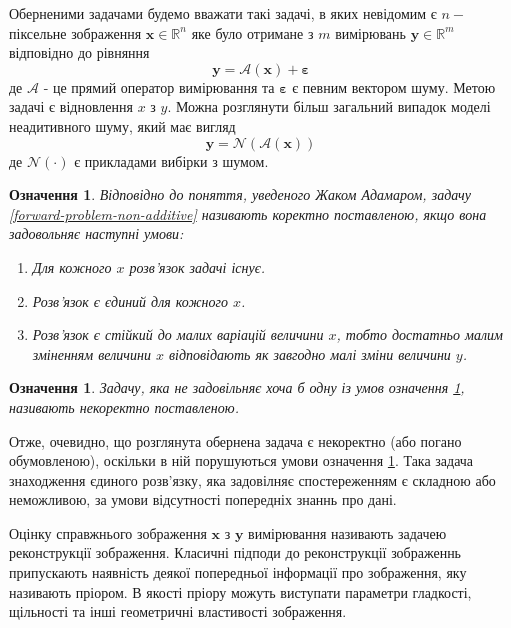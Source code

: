 \documentclass[14pt,a4paper]{extarticle}
\newcounter{e}
\newtheorem{defn}[theorem]{Означення}
\numberwithin{equation}{section}
\numberwithin{figure}{section}
\begin{document}
	
	
	
	Оберненими задачами будемо вважати такі задачі, в яких невідомим є $n-$ піксельне зображення $\boldsymbol{x} \in \mathbb{R}^{n}$ яке було отримане з $m$ вимірювань $\boldsymbol{y} \in \mathbb{R}^{m}$ відповідно до рівняння
	\begin{equation}
	\label{forward-problem}
	\boldsymbol{y}=\mathcal{A}\left(\boldsymbol{x}\right)+\boldsymbol{\varepsilon}
	\end{equation}
	де $\mathcal{A}$ - це прямий оператор вимірювання та $\boldsymbol{\varepsilon}$ є певним вектором шуму. Метою задачі є відновлення $x$ з $y$. Можна розглянути більш загальний випадок моделі неадитивного шуму, який має вигляд 
	\begin{equation}
	\label{forward-problem-non-additive}
	\boldsymbol{y}=\mathcal{N}\left(\mathcal{A}\left(\boldsymbol{x}\right)\right)
	\end{equation}
	де $\mathcal{N}(\cdot)$ є прикладами вибірки з шумом.


	\begin{defn}
		\label{well-posed}
		Відповідно до поняття, уведеного Жаком Адамаром, задачу \ref{forward-problem-non-additive} називають коректно поставленою, якщо вона задовольняє наступні умови: 
		\begin{enumerate}
			\item Для кожного $x$ розв'язок задачі існує.
			\item Розв'язок є єдиний для кожного $x$.
			\item Розв'язок є стійкий до малих варіацій величини $x$, тобто достатньо малим зміненням величини $x$ відповідають як завгодно малі зміни величини $y$.
		\end{enumerate}
	\end{defn}

	\begin{defn}
		\label{ill-posed}	
		Задачу, яка не задовільняє хоча б одну із умов означення \ref{well-posed}, називають некоректно поставленою.
	\end{defn}

	Отже, очевидно, що розглянута обернена задача є некоректно (або погано обумовленою), оскільки в ній порушуються умови означення \ref{well-posed}. Така задача знаходження єдиного розв'язку, яка задовілняє спостереженням є складною або неможливою, за умови відсутності попередніх знаннь про дані.

	Оцінку справжнього зображення $\boldsymbol{x}$ з $\boldsymbol{y}$  вимірювання називають задачею реконструкції зображення. Класичні підподи до реконструкції зображеннь припускають наявність деякої попередньої інформації про зображення, яку називають пріором. В якості пріору можуть виступати параметри гладкості, щільності та інші геометричні властивості зображення.
\end{document}
